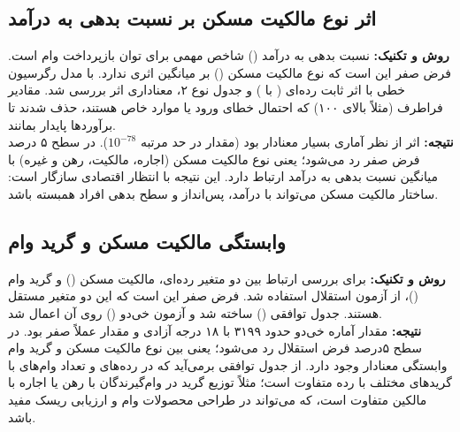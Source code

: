 \documentclass[12pt]{article}
\begin{document}
	\subsection{اثر نوع مالکیت مسکن بر نسبت بدهی به درآمد}
	\textbf{روش و تکنیک:} نسبت بدهی به درآمد () شاخص مهمی برای توان بازپرداخت وام است. فرض صفر این است که نوع مالکیت مسکن () بر میانگین  اثری ندارد. با مدل رگرسیون خطی با اثر ثابت رده‌ای ( با ) و جدول  نوع ۲، معناداری اثر بررسی شد. مقادیر فراطرف  (مثلاً بالای ۱۰۰) که احتمال خطای ورود یا موارد خاص هستند، حذف شدند تا برآوردها پایدار بمانند.
	~\\
	\textbf{نتیجه:} اثر  از نظر آماری بسیار معنادار بود (مقدار  در حد مرتبه $10^{-78}$). در سطح ۵ درصد فرض صفر رد می‌شود؛ یعنی نوع مالکیت مسکن (اجاره، مالکیت، رهن و غیره) با میانگین نسبت بدهی به درآمد ارتباط دارد. این نتیجه با انتظار اقتصادی سازگار است: ساختار مالکیت مسکن می‌تواند با درآمد، پس‌انداز و سطح بدهی افراد همبسته باشد.

	\subsection{وابستگی مالکیت مسکن و گرید وام}
	\textbf{روش و تکنیک:} برای بررسی ارتباط بین دو متغیر رده‌ای، مالکیت مسکن () و گرید وام ()، از آزمون استقلال استفاده شد. فرض صفر این است که این دو متغیر مستقل هستند. جدول توافقی () ساخته شد و آزمون خی‌دو () روی آن اعمال شد.
	~\\
	\textbf{نتیجه:} مقدار آماره خی‌دو حدود ۳۱۹۹ با ۱۸ درجه آزادی و مقدار  عملاً صفر بود. در سطح ۵درصد فرض استقلال رد می‌شود؛ یعنی بین نوع مالکیت مسکن و گرید وام وابستگی معنادار وجود دارد. از جدول توافقی برمی‌آید که در رده‌های  و  تعداد وام‌های با گریدهای مختلف با رده  متفاوت است؛ مثلاً توزیع گرید در وام‌گیرندگان با رهن یا اجاره با مالکین متفاوت است، که می‌تواند در طراحی محصولات وام و ارزیابی ریسک مفید باشد.
\end{document}
